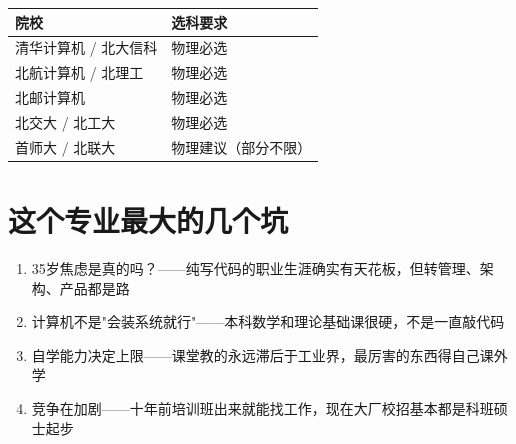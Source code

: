 \documentclass[a4paper,12pt]{ctexart}
\begin{document}
\begin{tabular}{ll}
\toprule
院校 & 选科要求 \\
\midrule
清华计算机 / 北大信科 & 物理必选 \\
北航计算机 / 北理工 & 物理必选 \\
北邮计算机 & 物理必选 \\
北交大 / 北工大 & 物理必选 \\
首师大 / 北联大 & 物理建议（部分不限） \\
\bottomrule
\end{tabular}

\section{这个专业最大的几个坑}

\begin{enumerate}
  \item 35岁焦虑是真的吗？——纯写代码的职业生涯确实有天花板，但转管理、架构、产品都是路
  \item 计算机不是"会装系统就行"——本科数学和理论基础课很硬，不是一直敲代码
  \item 自学能力决定上限——课堂教的永远滞后于工业界，最厉害的东西得自己课外学
  \item 竞争在加剧——十年前培训班出来就能找工作，现在大厂校招基本都是科班硕士起步
\end{enumerate}
\end{document}
